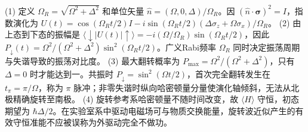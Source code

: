 (1) 定义 \(\Omega_R=\sqrt{\Omega^2+\Delta^2}\) 和单位矢量 \(\hat n=(\Omega,0,\Delta)/\Omega_R\)。因 \((\hat n\cdot\boldsymbol\sigma)^2=I\)，指数演化为 \(U(t)=\cos(\Omega_Rt/2)I-i\sin(\Omega_Rt/2)(\Delta\sigma_z+\Omega\sigma_x)/\Omega_R\)。
(2) 由上态到下态的振幅是 \(\langle\downarrow|U(t)|\uparrow\rangle=-i(\Omega/\Omega_R)\sin(\Omega_Rt/2)\)，因此 \(P_\downarrow(t)=\Omega^2/(\Omega^2+\Delta^2)\sin^2(\Omega_Rt/2)\)。广义Rabi频率 \(\Omega_R\) 同时决定振荡周期与失谐导致的振荡对比度。
(3) 最大翻转概率为 \(P_{\max}=\Omega^2/(\Omega^2+\Delta^2)\)，只有 \(\Delta=0\) 时才能达到一。共振时 \(P_\downarrow=\sin^2(\Omega t/2)\)，首次完全翻转发生在 \(t_\pi=\pi/\Omega\)，称为 \(\pi\) 脉冲；非零失谐时纵向哈密顿量分量使演化轴倾斜，无法从北极精确旋转至南极。
(4) 旋转参考系哈密顿量不随时间改变，故 \(\langle H\rangle\) 守恒，初态期望为 \(\hbar\Delta/2\)。在实验室系中驱动电磁场可与物质交换能量，旋转波近似产生的有效守恒准能不应被误称为外驱动完全不做功。
